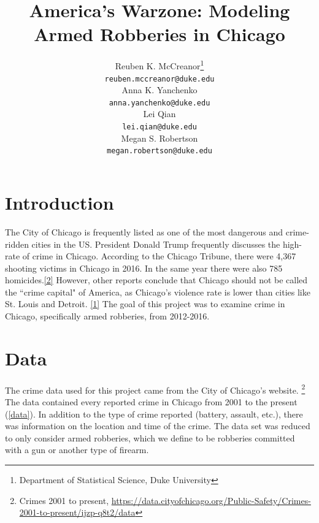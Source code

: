 \documentclass{article} %
\title{America's Warzone: Modeling Armed Robberies in Chicago}
\author{
Reuben K. McCreanor\thanks{Department of Statistical Science, Duke University} \\  
\texttt{reuben.mccreanor@duke.edu} \\
\And
Anna K. Yanchenko\footnotemark[1] \\
\texttt{anna.yanchenko@duke.edu} \\
\And 
Lei Qian\footnotemark[1] \\
\texttt{lei.qian@duke.edu} \\
\And
Megan S. Robertson\footnotemark[1] \\
\texttt{megan.robertson@duke.edu} \\ 
}
\begin{document}
\maketitle

\section{Introduction}
\label{headings}

\noindent The City of Chicago is frequently listed as one of the most dangerous and crime-ridden cities in the US. President Donald Trump frequently discusses the high-rate of crime in Chicago. According to the Chicago Tribune, there were 4,367 shooting victims in Chicago in 2016. In the same year there were also 785 homicides.\hyperlink{Ref2}{[2]} However, other reports conclude that Chicago should not be called the ``crime capital" of America, as Chicago's violence rate is lower than cities like St.  Louis and Detroit. \hyperlink{Ref1}{[1]} The goal of this project was to examine crime in Chicago, specifically armed robberies, from 2012-2016. \newline

\section{Data}
\label{headings}

\noindent The crime data used for this project came from the City of Chicago's website. \footnote{Crimes 2001 to present, \url{https://data.cityofchicago.org/Public-Safety/Crimes-2001-to-present/ijzp-q8t2/data}} The data contained every reported crime in Chicago from 2001 to the present (\autoref{data}). In addition to the type of crime reported (battery, assault, etc.), there was information on the location and time of the crime. The data set was reduced to only consider armed robberies, which we define to be robberies committed with a gun or another type of firearm. 
\end{document}
